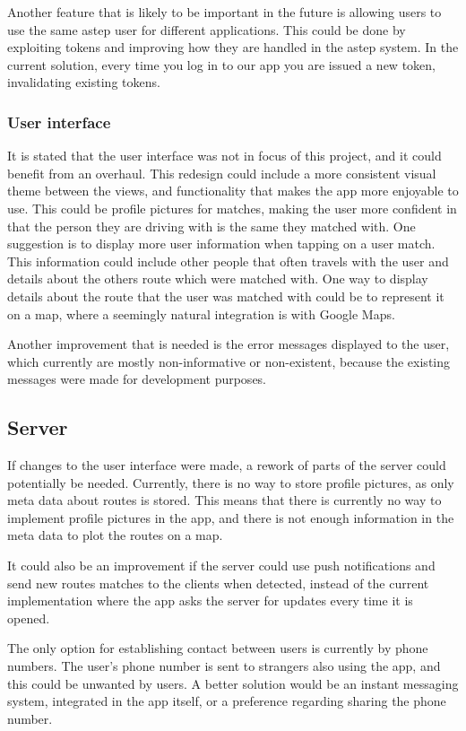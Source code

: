 Another feature that is likely to be important in the future is allowing users to use the same \gls{astep} user for different applications.
This could be done by exploiting tokens and improving how they are handled in the \gls{astep} system.
In the current solution, every time you log in to our app you are issued a new token, invalidating existing tokens.

\subsubsection*{User interface}
It is stated that the user interface was not in focus of this project, and it could benefit from an overhaul.
This redesign could include a more consistent visual theme between the views, and functionality that makes the app more enjoyable to use.
This could be profile pictures for matches, making the user more confident in that the person they are driving with is the same they matched with.
One suggestion is to display more user information when tapping on a user match.
This information could include other people that often travels with the user and details about the others route which were matched with.
One way to display details about the route that the user was matched with could be to represent it on a map, where a seemingly natural integration is with Google Maps.

Another improvement that is needed is the error messages displayed to the user, which currently are mostly non-informative or non-existent, because the existing messages were made for development purposes.

\subsection{Server}
If changes to the user interface were made, a rework of parts of the server could potentially be needed.
Currently, there is no way to store profile pictures, as only meta data about routes is stored.
This means that there is currently no way to implement profile pictures in the app, and there is not enough information in the meta data to plot the routes on a map.

It could also be an improvement if the server could use push notifications and send new routes matches to the clients when detected, instead of the current implementation where the app asks the server for updates every time it is opened.

The only option for establishing contact between users is currently by phone numbers.
The user's phone number is sent to strangers also using the app, and this could be unwanted by users.
A better solution would be an instant messaging system, integrated in the app itself, or a preference regarding sharing the phone number.

